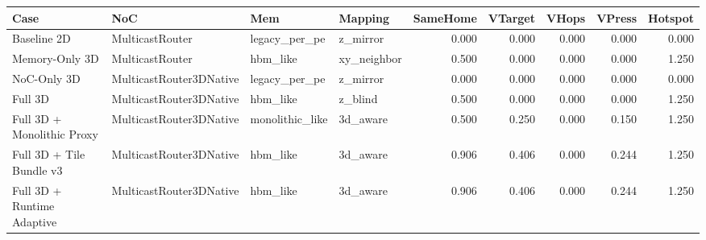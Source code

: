 \begin{tabular}{l l l l r r r r r}
\hline
Case & NoC & Mem & Mapping & SameHome & VTarget & VHops & VPress & Hotspot \\
\hline
Baseline 2D & MulticastRouter & legacy\_per\_pe & z\_mirror & 0.000 & 0.000 & 0.000 & 0.000 & 0.000 \\
Memory-Only 3D & MulticastRouter & hbm\_like & xy\_neighbor & 0.500 & 0.000 & 0.000 & 0.000 & 1.250 \\
NoC-Only 3D & MulticastRouter3DNative & legacy\_per\_pe & z\_mirror & 0.000 & 0.000 & 0.000 & 0.000 & 0.000 \\
Full 3D & MulticastRouter3DNative & hbm\_like & z\_blind & 0.500 & 0.000 & 0.000 & 0.000 & 1.250 \\
Full 3D + Monolithic Proxy & MulticastRouter3DNative & monolithic\_like & 3d\_aware & 0.500 & 0.250 & 0.000 & 0.150 & 1.250 \\
Full 3D + Tile Bundle v3 & MulticastRouter3DNative & hbm\_like & 3d\_aware & 0.906 & 0.406 & 0.000 & 0.244 & 1.250 \\
Full 3D + Runtime Adaptive & MulticastRouter3DNative & hbm\_like & 3d\_aware & 0.906 & 0.406 & 0.000 & 0.244 & 1.250 \\
\hline
\end{tabular}
